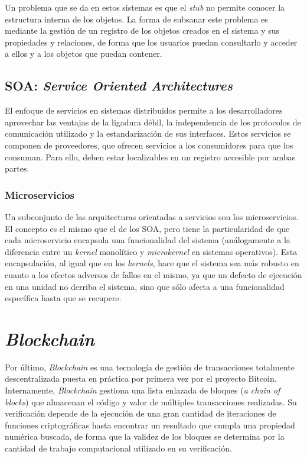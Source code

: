 \documentclass[runningheads]{llncs}
\begin{document}
Un problema que se da en estos sistemas es que el \textit{stub} no permite conocer la estructura interna de los objetos.
La forma de subsanar este problema es mediante la gestión de un registro de los objetos creados en el sistema y sus propiedades y relaciones, de forma que los usuarios puedan consultarlo y acceder a ellos y a los objetos que puedan contener.

\subsection{SOA\@: \textit{Service Oriented Architectures}}

El enfoque de servicios en sistemas distribuidos permite a los desarrolladores aprovechar las ventajas de la ligadura débil, la independencia de los protocolos de comunicación utilizado y la estandarización de sus interfaces.
Estos servicios se componen de proveedores, que ofrecen servicios a los consumidores para que los consuman.
Para ello, deben estar localizables en un registro accesible por ambas partes.

\subsubsection{Microservicios}

Un subconjunto de las arquitecturas orientadas a servicios son los microservicios.
El concepto es el mismo que el de los SOA, pero tiene la particularidad de que cada microservicio encapsula una funcionalidad del sistema (análogamente a la diferencia entre un \textit{kernel} monolítico y \textit{microkernel} en sistemas operativos).
Esta encapsulación, al igual que en los \textit{kernels}, hace que el sistema sea más robusto en cuanto a los efectos adversos de fallos en el mismo, ya que un defecto de ejecución en una unidad no derriba el sistema, sino que sólo afecta a una funcionalidad específica hasta que se recupere.

\section{\textit{Blockchain}}

Por último, \textit{Blockchain} es una tecnología de gestión de transacciones totalmente descentralizada puesta en práctica por primera vez por el proyecto Bitcoin\cite{bitcoin}.
Internamente, \textit{Blockchain} gestiona una lista enlazada de bloques (\textit{a chain of blocks}) que almacenan el código y valor de múltiples transacciones realizadas.
Su verificación depende de la ejecución de una gran cantidad de iteraciones de funciones criptográficas hasta encontrar un resultado que cumpla una propiedad numérica buscada, de forma que la validez de los bloques se determina por la cantidad de trabajo computacional utilizado en su verificación.
\end{document}
